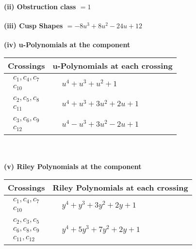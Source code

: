 \documentclass[1p]{elsarticle_modified}
\theoremstyle{definition}
\begin{document}
\flushleft \textbf{(ii) Obstruction class $= 1$}\\~\\
\flushleft \textbf{(iii) Cusp Shapes $= -8 u^3+8 u^2-24 u+12$}\\~\\
\newpage\renewcommand{\arraystretch}{1}
\flushleft \textbf{(iv) u-Polynomials at the component}\newline \\
\begin{tabular}{m{50pt}|m{274pt}}
Crossings & \hspace{64pt}u-Polynomials at each crossing \\
\hline $$\begin{aligned}c_{1},c_{4},c_{7}\\c_{10}\end{aligned}$$&$\begin{aligned}
&u^4+u^3+u^2+1
\end{aligned}$\\
\hline $$\begin{aligned}c_{2},c_{5},c_{8}\\c_{11}\end{aligned}$$&$\begin{aligned}
&u^4+u^3+3 u^2+2 u+1
\end{aligned}$\\
\hline $$\begin{aligned}c_{3},c_{6},c_{9}\\c_{12}\end{aligned}$$&$\begin{aligned}
&u^4- u^3+3 u^2-2 u+1
\end{aligned}$\\
\hline
\end{tabular}\\~\\
\newpage\renewcommand{\arraystretch}{1}
\flushleft \textbf{(v) Riley Polynomials at the component}\newline \\
\begin{tabular}{m{50pt}|m{274pt}}
Crossings & \hspace{64pt}Riley Polynomials at each crossing \\
\hline $$\begin{aligned}c_{1},c_{4},c_{7}\\c_{10}\end{aligned}$$&$\begin{aligned}
&y^4+y^3+3 y^2+2 y+1
\end{aligned}$\\
\hline $$\begin{aligned}c_{2},c_{3},c_{5}\\c_{6},c_{8},c_{9}\\c_{11},c_{12}\end{aligned}$$&$\begin{aligned}
&y^4+5 y^3+7 y^2+2 y+1
\end{aligned}$\\
\hline
\end{tabular}\\~\\
\end{document}
